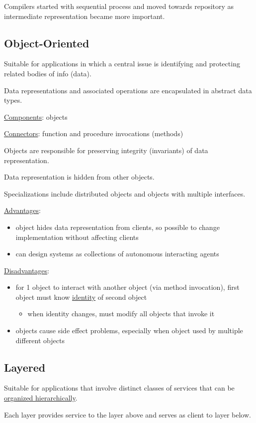 \documentclass[11pt]{article}
\begin{document}
Compilers started with sequential process and moved towards repository as intermediate
representation became more important.
\subsection{Object-Oriented}
\label{sec:orgd4900d5}
Suitable for applications in which a central issue is identifying and protecting related bodies
of info (data).

Data representations and associated operations are encapsulated in abstract data types.

\uline{Components}: objects

\uline{Connectors}: function and procedure invocations (methods)

Objects are responsible for preserving integrity (invariants) of data representation.

Data representation is hidden from other objects.

Specializations include distributed objects and objects with multiple interfaces.

\uline{Advantages}:
\begin{itemize}
\item object hides data representation from clients, so possible to change implementation without
affecting clients
\item can design systems as collections of autonomous interacting agents
\end{itemize}

\uline{Disadvantages}:
\begin{itemize}
\item for 1 object to interact with another object (via method invocation), first object must know
\uline{identity} of second object
\begin{itemize}
\item when identity changes, must modify all objects that invoke it
\end{itemize}
\item objects cause side effect problems, especially when object used by multiple different objects
\end{itemize}
\subsection{Layered}
\label{sec:org8f2071a}
Suitable for applications that involve distinct classes of services that can be
\uline{organized hierarchically}.

Each layer provides service to the layer above and serves as client to layer below.
\end{document}
